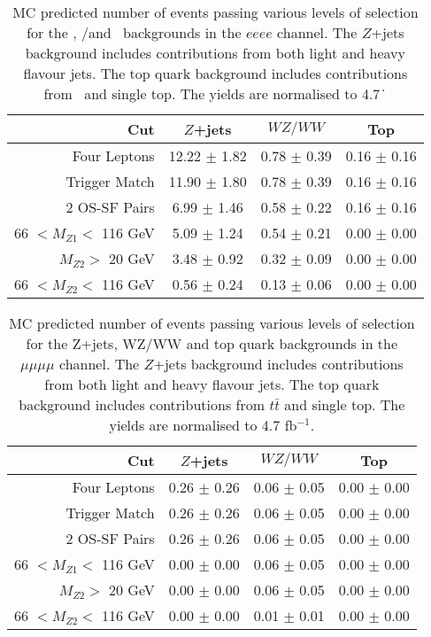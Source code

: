 \begin{table}[htbp]
  \centering
  \begin{tabular}{r|c|c|c} 
    \hline\hline
                 Cut &               $Z$+jets &             $WZ/WW$ &               Top\\ 
    \hline
        Four Leptons &  12.22 $\pm$ 1.82 & 0.78 $\pm$ 0.39 & 0.16 $\pm$ 0.16 \\ 
       Trigger Match &  11.90 $\pm$ 1.80 & 0.78 $\pm$ 0.39 & 0.16 $\pm$ 0.16 \\ 
       2 OS-SF Pairs &  6.99 $\pm$ 1.46 & 0.58 $\pm$ 0.22 & 0.16 $\pm$ 0.16 \\ 
66 $ < M_{Z1} < $ 116 GeV &  5.09 $\pm$ 1.24 & 0.54 $\pm$ 0.21 & 0.00 $\pm$ 0.00 \\ 
  $M_{Z2} > $ 20 GeV &  3.48 $\pm$ 0.92 & 0.32 $\pm$ 0.09 & 0.00 $\pm$ 0.00 \\ 
66 $ < M_{Z2} < $ 116 GeV &  0.56 $\pm$ 0.24 & 0.13 $\pm$ 0.06 & 0.00 $\pm$ 0.00 \\ 
    \hline\hline
  \end{tabular}
  \caption[MC predicted number of events passing various levels of selection for
  the \Zjets, \WZ/\WW and \topquark\ backgrounds in the $eeee$ channel.]
  {MC predicted number of events passing various levels of selection for
  the \Zjets, \WZ/\WW and \topquark\ backgrounds in the $eeee$ channel. The
  $Z$+jets background includes contributions from both light and heavy flavour
  jets. The top quark background includes contributions from \ttbar\ and
  single top. The yields are normalised to 4.7~\ifb\.
}
  \label{table:mc-bg-4e}
\end{table}

\begin{table}[htbp]
  \centering
  \begin{tabular}{r|c|c|c} 
    \hline\hline
                 Cut &               $Z$+jets &             $WZ/WW$ &               Top\\ 
    \hline

        Four Leptons &  0.26 $\pm$ 0.26 & 0.06 $\pm$ 0.05 & 0.00 $\pm$ 0.00 \\ 
       Trigger Match &  0.26 $\pm$ 0.26 & 0.06 $\pm$ 0.05 & 0.00 $\pm$ 0.00 \\ 
       2 OS-SF Pairs &  0.26 $\pm$ 0.26 & 0.06 $\pm$ 0.05 & 0.00 $\pm$ 0.00 \\ 
66 $ < M_{Z1} < $ 116 GeV &  0.00 $\pm$ 0.00 & 0.06 $\pm$ 0.05 & 0.00 $\pm$ 0.00 \\ 
  $M_{Z2} > $ 20 GeV &  0.00 $\pm$ 0.00 & 0.06 $\pm$ 0.05 & 0.00 $\pm$ 0.00 \\ 
66 $ < M_{Z2} < $ 116 GeV &  0.00 $\pm$ 0.00 & 0.01 $\pm$ 0.01 & 0.00 $\pm$ 0.00 \\ 
    \hline\hline
  \end{tabular}
  \caption{MC predicted number of events passing various levels of selection for the Z+jets, WZ/WW and top quark backgrounds in the $\mu\mu\mu\mu$ channel. The $Z$+jets background includes contributions from both light and heavy flavour jets. The top quark background includes contributions from $t\bar t$ and single top. The yields are normalised to 4.7 fb$^{-1}$.
}
  \label{table:mc-bg-4mu}
\end{table}

